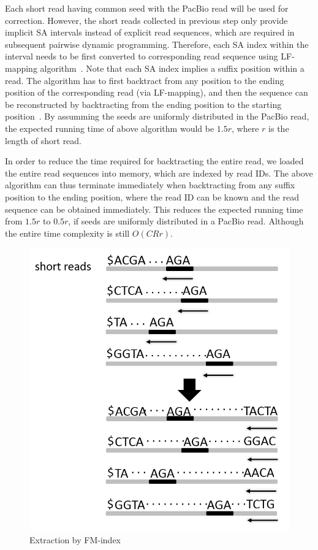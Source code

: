 Each short read having common seed with the PacBio read will be used for correction. However, the short reads collected in previous step only provide implicit SA intervals instead of explicit read sequences, which are required in subsequent pairwise dynamic programming. Therefore, each SA index within the interval needs to be first converted to corresponding read sequence using LF-mapping algorithm~\cite{pmid19261174}. Note that each SA index implies a suffix position within a read. The algorithm has to first backtract from any position to the ending position of the corresponding read (via LF-mapping), and then the sequence can be reconstructed by backtracting from the ending position to the starting position~\cite{pmid20529929}. By assumming the seeds are uniformly distributed in the PacBio read, the expected running time of above algorithm would be $1.5r$, where $r$ is the length of short read.

In order to reduce the time required for backtracting the entire read, we loaded the entire read sequences into memory, which are indexed by read IDs. The above algorithm can thus terminate immediately when backtracting from any suffix position to the ending position, where the read ID can be known and the read sequence can be obtained immediately. This reduces the expected running time from $1.5r$ to $0.5r$, if seeds are uniformly distributed in a PacBio read. Although the entire time complexity is still $O(CRr)$.

\begin{figure} [h]
\centering
\includegraphics[scale=0.50]{Figures/chapter3/extraction_fm_index.png}
\caption{Extraction by FM-index}
\label{extraction_fm_index}
\end{figure}

